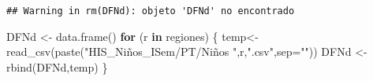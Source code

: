 \documentclass[
]{article}
\newenvironment{Shaded}{\begin{snugshade}}{\end{snugshade}}
\newcommand{\AttributeTok}[1]{\textcolor[rgb]{0.77,0.63,0.00}{#1}}
\newcommand{\ControlFlowTok}[1]{\textcolor[rgb]{0.13,0.29,0.53}{\textbf{#1}}}
\newcommand{\FunctionTok}[1]{\textcolor[rgb]{0.00,0.00,0.00}{#1}}
\newcommand{\NormalTok}[1]{#1}
\newcommand{\OtherTok}[1]{\textcolor[rgb]{0.56,0.35,0.01}{#1}}
\newcommand{\StringTok}[1]{\textcolor[rgb]{0.31,0.60,0.02}{#1}}
\begin{document}
\begin{verbatim}
## Warning in rm(DFNd): objeto 'DFNd' no encontrado
\end{verbatim}

\begin{Shaded}
\begin{Highlighting}[]
\NormalTok{DFNd }\OtherTok{\textless{}{-}} \FunctionTok{data.frame}\NormalTok{()}
\ControlFlowTok{for}\NormalTok{ (r }\ControlFlowTok{in}\NormalTok{ regiones) \{}
\NormalTok{  temp}\OtherTok{\textless{}{-}} \FunctionTok{read\_csv}\NormalTok{(}\FunctionTok{paste}\NormalTok{(}\StringTok{"HIS\_Niños\_ISem/PT/Niños "}\NormalTok{,r,}\StringTok{".csv"}\NormalTok{,}\AttributeTok{sep=}\StringTok{""}\NormalTok{))}
\NormalTok{  DFNd }\OtherTok{\textless{}{-}} \FunctionTok{rbind}\NormalTok{(DFNd,temp)}
\NormalTok{\}}
\end{Highlighting}
\end{Shaded}
\end{document}
